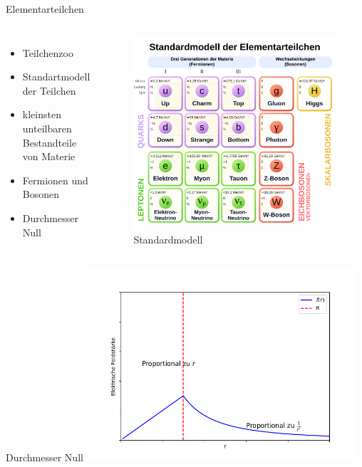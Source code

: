 \documentclass[aspectratio=169,xcolor=dvipsnames]{beamer}
\begin{document}
\begin{frame}{Elementarteilchen}
    \begin{columns}[c]
        \begin{itemize}
            \item Teilchenzoo
            \item Standartmodell der Teilchen
            \item kleinsten unteilbaren Bestandteile von Materie
            \item Fermionen und Bosonen
            \item Durchmesser Null
        \end{itemize}
        \begin{figure}
            \centering
            \includegraphics[width=0.9\linewidth]{figures/standartmodell.png}
            \caption{Standardmodell}
            \label{fig:standardmodell}
        \end{figure}
    \end{columns}
\end{frame}
\begin{frame}{Durchmesser Null}
    \includegraphics[width=10cm]{figures/elektron.png}
\end{frame}
\end{document}
